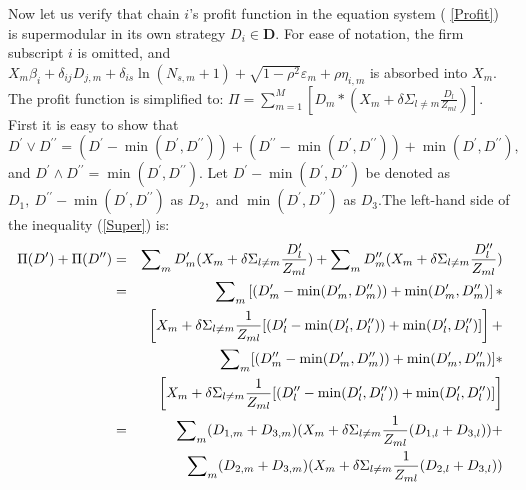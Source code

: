 \documentclass[notitlepage,onecolumn,11pt]{article}
\begin{document}
Now let us verify that chain $i$'s profit function in the equation system (%
\ref{Profit}) is supermodular in its own strategy $D_{i}\in \mathbf{D}$. For
ease of notation, the firm subscript $i$ is omitted, and $X_{m}\beta
_{i}+\delta _{ij}D_{j,m}+\delta _{is}\ln (N_{s,m}+1)+\sqrt{1-\rho ^{2}}%
\varepsilon _{m}+\rho \eta _{i,m}$ is absorbed into $X_{m}$. The profit
function is simplified to: $\Pi =\sum_{m=1}^{M}\left[ D_{m}\ast
(X_{m}+\delta \Sigma _{l\neq m}\frac{D_{l}}{Z_{ml}})\right] .$ First it is
easy to show that $D^{\prime }\vee D^{\prime \prime }=(D^{\prime }-\min
(D^{\prime },D^{\prime \prime }))+(D^{\prime \prime }-\min (D^{\prime
},D^{\prime \prime }))+\min (D^{\prime },D^{\prime \prime }),$ and $%
D^{\prime }\wedge D^{\prime \prime }=\min (D^{\prime },D^{\prime \prime }).$
Let $D^{\prime }-\min (D^{\prime },D^{\prime \prime })$ be denoted as $%
D_{1},~D^{\prime \prime }-\min (D^{\prime },D^{\prime \prime })$ as $D_{2},$
and $\min (D^{\prime },D^{\prime \prime })$ as $D_{3}.$The left-hand side of
the inequality (\ref{Super}) is:%
\begin{eqnarray*}
\Pi (D^{\prime })+\Pi (D^{\prime \prime }) &=&\sum\nolimits_{m}D_{m}^{\prime
}(X_{m}+\delta \Sigma _{l\neq m}\frac{D_{l}^{\prime }}{Z_{ml}}%
)+\sum\nolimits_{m}D_{m}^{\prime \prime }(X_{m}+\delta \Sigma _{l\neq m}%
\frac{D_{l}^{\prime \prime }}{Z_{ml}}) \\
&=&\sum\nolimits_{m}\left[ (D_{m}^{\prime }-\min (D_{m}^{\prime
},D_{m}^{\prime \prime }))+\min (D_{m}^{\prime },D_{m}^{\prime \prime })%
\right] \ast \\
&&\left[ X_{m}+\delta \Sigma _{l\neq m}\frac{1}{Z_{ml}}[(D_{l}^{\prime
}-\min (D_{l}^{\prime },D_{l}^{\prime \prime }))+\min (D_{l}^{\prime
},D_{l}^{\prime \prime })]\right] + \\
&&\sum\nolimits_{m}[(D_{m}^{\prime \prime }-\min (D_{m}^{\prime
},D_{m}^{\prime \prime }))+\min (D_{m}^{\prime },D_{m}^{\prime \prime })]\ast
\\
&&\left[ X_{m}+\delta \Sigma _{l\neq m}\frac{1}{Z_{ml}}[(D_{l}^{\prime
\prime }-\min (D_{l}^{\prime },D_{l}^{\prime \prime }))+\min (D_{l}^{\prime
},D_{l}^{\prime \prime })]\right] \\
&=&\sum\nolimits_{m}(D_{1,m}+D_{3,m})(X_{m}+\delta \Sigma _{l\neq m}\frac{1}{%
Z_{ml}}(D_{1,l}+D_{3,l}))+ \\
&&\sum\nolimits_{m}(D_{2,m}+D_{3,m})(X_{m}+\delta \Sigma _{l\neq m}\frac{1}{%
Z_{ml}}(D_{2,l}+D_{3,l}))
\end{eqnarray*}
\end{document}

